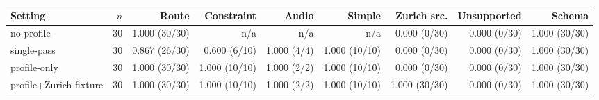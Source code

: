 \begin{tabular}{lrrrrrrrr}
\toprule
Setting & $n$ & Route & Constraint & Audio & Simple & Zurich src. & Unsupported & Schema \\
\midrule
no-profile & 30 & 1.000 (30/30) & n/a & n/a & n/a & 0.000 (0/30) & 0.000 (0/30) & 1.000 (30/30) \\
single-pass & 30 & 0.867 (26/30) & 0.600 (6/10) & 1.000 (4/4) & 1.000 (10/10) & 0.000 (0/30) & 0.000 (0/30) & 1.000 (30/30) \\
profile-only & 30 & 1.000 (30/30) & 1.000 (10/10) & 1.000 (2/2) & 1.000 (10/10) & 0.000 (0/30) & 0.000 (0/30) & 1.000 (30/30) \\
profile+Zurich fixture & 30 & 1.000 (30/30) & 1.000 (10/10) & 1.000 (2/2) & 1.000 (10/10) & 1.000 (30/30) & 0.000 (0/30) & 1.000 (30/30) \\
\bottomrule
\end{tabular}
